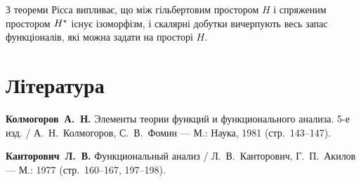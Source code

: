 \begin{remark}
З теореми Рісса випливає, що
між гільбертовим простором $H$
і спряженим простором $H^\star$
існує ізоморфізм,
і скалярні добутки вичерпують
весь запас функціоналів,
які можна задати на просторі $H$.
\end{remark}

\section{Література}

\begin{enumerate}[label={[\arabic*]}]
\item \textbf{Колмогоров~А.~Н.}
Элементы теории функций и функционального анализа. 5-е изд. /
А.~Н.~Колмогоров, С.~В.~Фомин ---
М.: Наука, 1981 (стр.~143--147).
\item \textbf{Канторович~Л.~В.}
Функциональный анализ /
Л.~В.~Канторович, Г.~П.~Акилов ---
М.: 1977 (стр.~160--167, 197--198).
\end{enumerate}
